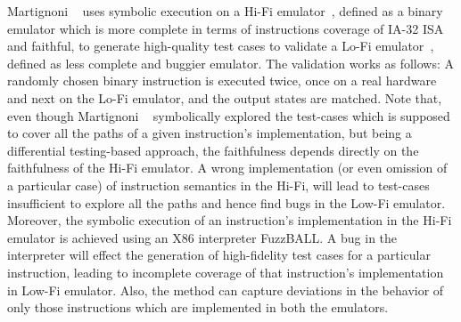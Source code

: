 Martignoni \etal~\cite{Martignoni:ASPLOS2012} uses symbolic execution on a
Hi-Fi emulator~\cite{Bochs1996}, defined  as a binary emulator which is more
complete in terms of instructions coverage of IA-32 ISA and faithful, to
generate high-quality test cases to validate  a Lo-Fi
emulator~\cite{QEMU:USENIX05}, defined as less complete and buggier emulator.
The validation works as follows: A randomly chosen binary instruction is
executed twice, once on a real hardware and next on the Lo-Fi emulator, and the
output states are matched.
%
Note that, even though Martignoni
\etal~\cite{Martignoni:ASPLOS2012} symbolically explored the test-cases which
is supposed to cover all the paths of a given instruction's implementation, but
being a differential testing-based approach, the faithfulness depends directly
on  the faithfulness of the Hi-Fi emulator. A wrong implementation (or even
    omission of a particular case) of instruction semantics in the Hi-Fi, will
lead to test-cases insufficient to explore all the paths and hence find bugs in
the Low-Fi emulator. 
%
Moreover, the symbolic execution of an instruction's implementation in the
Hi-Fi emulator is achieved using an X86 interpreter FuzzBALL. A bug in the
interpreter will effect the generation of high-fidelity test cases for a particular
instruction, leading to incomplete coverage of that instruction's implementation
in Low-Fi emulator.
%
 Also, the method can capture  deviations in the behavior of only those
    instructions which are implemented in both the emulators.

